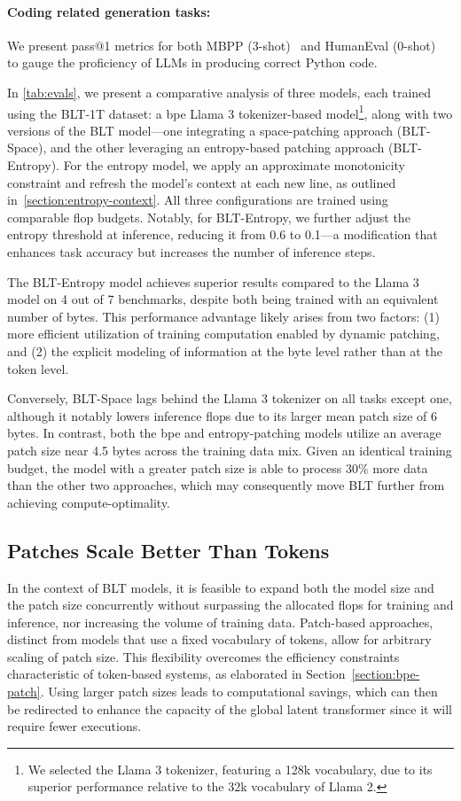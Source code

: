 \paragraph{Coding related generation tasks:} We present pass@1 metrics for both MBPP (3-shot)~\citep{Eval_MBPP} and HumanEval (0-shot)~\citep{Eval_HumanEval} to gauge the proficiency of LLMs in producing correct Python code.

In \autoref{tab:evals}, we present a comparative analysis of three models, each trained using the {\textsc BLT}-1T dataset: a bpe Llama 3 tokenizer-based model\footnote{We selected the Llama 3 tokenizer, featuring a 128k vocabulary, due to its superior performance relative to the 32k vocabulary of Llama 2.}, along with two versions of the {\textsc BLT} model—one integrating a space-patching approach ({\textsc BLT}-Space), and the other leveraging an entropy-based patching approach ({\textsc BLT}-Entropy). For the entropy model, we apply an approximate monotonicity constraint and refresh the model’s context at each new line, as outlined in~\autoref{section:entropy-context}. All three configurations are trained using comparable flop budgets. Notably, for {\textsc BLT}-Entropy, we further adjust the entropy threshold at inference, reducing it from 0.6 to 0.1—a modification that enhances task accuracy but increases the number of inference steps.

The {\textsc BLT}-Entropy model achieves superior results compared to the Llama 3 model on 4 out of 7 benchmarks, despite both being trained with an equivalent number of bytes. This performance advantage likely arises from two factors: (1) more efficient utilization of training computation enabled by dynamic patching, and (2) the explicit modeling of information at the byte level rather than at the token level.

Conversely, {\textsc BLT}-Space lags behind the Llama 3 tokenizer on all tasks except one, although it notably lowers inference flops due to its larger mean patch size of 6 bytes. In contrast, both the bpe and entropy-patching models utilize an average patch size near 4.5 bytes across the training data mix. Given an identical training budget, the model with a greater patch size is able to process 30\% more data than the other two approaches, which may consequently move {\textsc BLT} further from achieving compute-optimality.

\subsection{Patches Scale Better Than Tokens} In the context of {\textsc BLT} models, it is feasible to expand both the model size and the patch size concurrently without surpassing the allocated flops for training and inference, nor increasing the volume of training data. Patch-based approaches, distinct from models that use a fixed vocabulary of tokens, allow for arbitrary scaling of patch size. This flexibility overcomes the efficiency constraints characteristic of token-based systems, as elaborated in Section~\ref{section:bpe-patch}. Using larger patch sizes leads to computational savings, which can then be redirected to enhance the capacity of the global latent transformer since it will require fewer executions.

